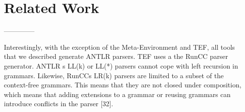 \chapter{Related Work}


--------------

Interestingly, with the exception of the Meta-Environment
and TEF, all tools that we described generate ANTLR
parsers. TEF uses a the RunCC parser generator. ANTLR s
LL(k) or LL(*) parsers cannot cope with left recursion in
grammars. Likewise, RunCCs LR(k) parsers are limited to
a subset of the context-free grammars. This means that they
are not closed under composition, which means that adding
extensions to a grammar or reusing grammars can introduce
conflicts in the parser [32]. 